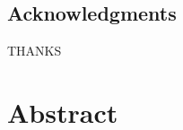 \documentclass[a4paper,11pt,twoside]{ThesisStyle}
\begin{document}

\dominitoc
{}
 \cleardoublepage
\section*{Acknowledgments}
THANKS

\tableofcontents
\mainmatter

\cleardoublepage
\chapter*{Abstract}

\end{document}
